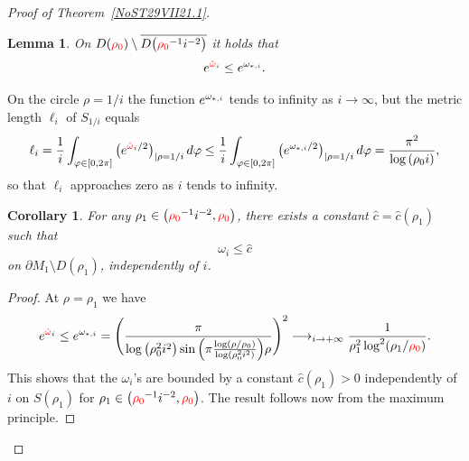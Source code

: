 \documentclass[10pt,a4paper]{article}
\numberwithin{equation}{section}
\newtheorem{Corollary}[Theorem]{Corollary}
\newtheorem{Lemma}[Theorem]{Lemma}
\newcommand{\hmv}{\red{\hat \omega}}
\newcommand{\mv}{\omega}%
\newcommand{\red}[1]{{\color{red}#1}}
\newcommand{\rhozero}{\red{\rho_0}}
\begin{document}
\begin{proof}[Proof of Theorem~\ref{NoST29VII21.1}]
\begin{Lemma}\label{NoSL23X21.1m}
On $D(\rhozero ) \setminus \overline{D\big(\rhozero^{-1} i^{-2}\big)}$ it holds that
\begin{equation} \label{NoS9XI21.2}
{\rm e}^{\hmv_i}\leq {\rm e}^{\mv_{*,i}}.
\end{equation}
\end{Lemma}

\begin{Remark} \label{NoSR22V22.1}
On the circle $\rho=1/i$ the function
${\rm e}^{\mv_{*,i}} $ tends to infinity as $i\to \infty$, but the metric length $\ell_i$ of $S_{1/i}$ equals
\[
\ell_i=\frac1i\int_{\varphi\in[0,2\pi]}\big({\rm e}^{\hmv_{i}/2}\big)_{|\rho=1/i}\, {\rm d} \varphi\leq\frac1i\int_{\varphi\in[0,2\pi]}\big({\rm e}^{\mv_{*,i}/2}\big)_{|\rho=1/i}\,{\rm d}\varphi=\frac{\pi^2}{\log{(\rho_0i)}},
\]
so that $\ell_i$ approaches zero as $i$ tends to infinity.
\end{Remark}

\begin{Corollary} \label{NoSC21XI21} For any $\rho_1\in\big(\rhozero^{-1} i^{-2},\rhozero \big)$,
 there exists a constant $\hat c =\hat c(\rho_1)$ such that
 \[
 \mv_i \le \hat c
 \]
 on $\partial M_1 \setminus D(\rho_1)$, independently of $i$.
\end{Corollary}

\begin{proof}
At $\rho=\rho_1$ we have
\begin{equation*}
{\rm e}^{\hmv_i}\leq {\rm e}^{\mv_{*,i}}=
\Bigg(
 \frac{\pi }{
 \log \big(\rho_0^2i^2\big) \sin\Big( \pi \frac{\log (\rho/\rho_0) }{\log (\rho_0^2i^2)} \Big) \rho
}
 \Bigg)^2
 \longrightarrow_{i\rightarrow +\infty}\frac{1}{\rho_1^2\log^2(\rho_1/\rhozero)}.
\end{equation*}
%
This shows that
the $\mv_i$'s are bounded by a constant $\hat c(\rho_1 ) >0 $ independently of $i$ on $S(\rho_1)$ for $\rho_1\in\big(\rhozero^{-1} i^{-2},\rhozero \big)$.
The result follows now from the maximum principle.
\end{proof}


\end{proof}
\end{document}
